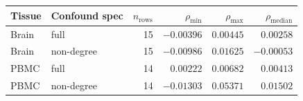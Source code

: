 \begin{tabular}{llrrrr}
\toprule
Tissue & Confound spec & $n_{\mathrm{rows}}$ & $\rho_{\min}$ & $\rho_{\max}$ & $\rho_{\mathrm{median}}$ \\ 
\midrule
Brain & full & 15 & $-0.00396$ & $0.00445$ & $0.00258$ \\
Brain & non-degree & 15 & $-0.00986$ & $0.01625$ & $-0.00053$ \\
PBMC & full & 14 & $0.00222$ & $0.00682$ & $0.00413$ \\
PBMC & non-degree & 14 & $-0.01303$ & $0.05371$ & $0.01502$ \\
\bottomrule
\end{tabular}
